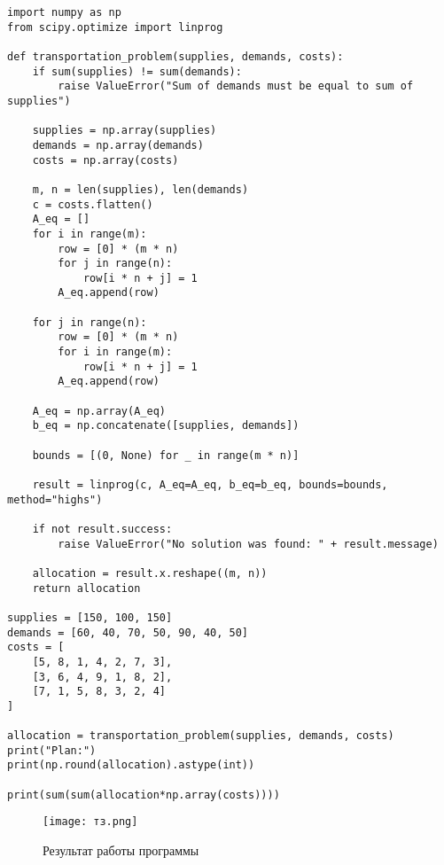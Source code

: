 \begin{lstlisting}
import numpy as np
from scipy.optimize import linprog

def transportation_problem(supplies, demands, costs):
    if sum(supplies) != sum(demands):
        raise ValueError("Sum of demands must be equal to sum of supplies")

    supplies = np.array(supplies)
    demands = np.array(demands)
    costs = np.array(costs)

    m, n = len(supplies), len(demands)
    c = costs.flatten()
    A_eq = []
    for i in range(m):
        row = [0] * (m * n)
        for j in range(n):
            row[i * n + j] = 1
        A_eq.append(row)

    for j in range(n):
        row = [0] * (m * n)
        for i in range(m):
            row[i * n + j] = 1
        A_eq.append(row)

    A_eq = np.array(A_eq)
    b_eq = np.concatenate([supplies, demands])

    bounds = [(0, None) for _ in range(m * n)]

    result = linprog(c, A_eq=A_eq, b_eq=b_eq, bounds=bounds, method="highs")

    if not result.success:
        raise ValueError("No solution was found: " + result.message)

    allocation = result.x.reshape((m, n))
    return allocation

supplies = [150, 100, 150]
demands = [60, 40, 70, 50, 90, 40, 50]
costs = [
    [5, 8, 1, 4, 2, 7, 3],
    [3, 6, 4, 9, 1, 8, 2],
    [7, 1, 5, 8, 3, 2, 4]
]

allocation = transportation_problem(supplies, demands, costs)
print("Plan:")
print(np.round(allocation).astype(int))

print(sum(sum(allocation*np.array(costs))))
\end{lstlisting}

\newpage

\begin{figure}[h]
\centering
\texttt{[image: тз.png]}
\centering
\caption{Результат работы программы}
\end{figure}
